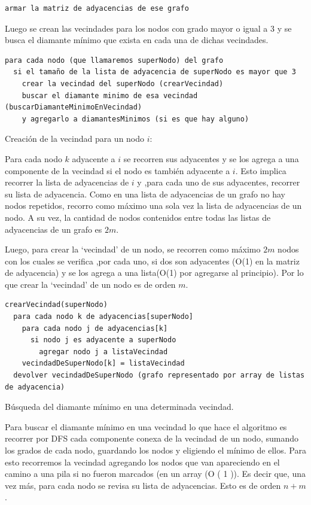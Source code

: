 \documentclass[a4paper,11pt] {article}
\begin{document}
\begin{verbatim}
armar la matriz de adyacencias de ese grafo
\end{verbatim}

Luego se crean las vecindades para los nodos con grado mayor o igual a 3 y se busca el diamante mínimo que exista en cada una de dichas vecindades.

\begin{verbatim}
para cada nodo (que llamaremos superNodo) del grafo
  si el tamaño de la lista de adyacencia de superNodo es mayor que 3
    crear la vecindad del superNodo (crearVecindad)
    buscar el diamante minimo de esa vecindad (buscarDiamanteMinimoEnVecindad)
    y agregarlo a diamantesMinimos (si es que hay alguno)
\end{verbatim}

Creación de la vecindad para un nodo $i$:

Para cada nodo $k$ adyacente a $i$ se recorren sus adyacentes y se los agrega a una componente de la vecindad si el nodo es también adyacente a $i$.
Esto implica recorrer la lista de adyacencias de $i$ y ,para cada uno de sus  adyacentes, recorrer su lista de adyacencia. Como en una lista de adyacencias de un grafo no hay nodos repetidos, recorro como máximo una sola vez la lista de adyacencias de un nodo. A su vez, la cantidad de nodos contenidos entre todas las listas de adyacencias de un grafo es $2m$.

Luego, para crear la ‘vecindad’ de un nodo, se recorren como máximo $2m$ nodos con los cuales se verifica ,por cada uno, si dos son adyacentes (O(1) en la matriz de adyacencia) y se los agrega a una lista(O(1) por agregarse al principio). Por lo que crear la ‘vecindad’ de un nodo es de orden $m$.

\begin{verbatim}
crearVecindad(superNodo)
  para cada nodo k de adyacencias[superNodo]
    para cada nodo j de adyacencias[k]
      si nodo j es adyacente a superNodo
        agregar nodo j a listaVecindad
    vecindadDeSuperNodo[k] = listaVecindad
  devolver vecindadDeSuperNodo (grafo representado por array de listas de adyacencia)
\end{verbatim}

Búsqueda del diamante mínimo en una determinada vecindad.

Para buscar el diamante mínimo en una vecindad lo que hace el algoritmo es recorrer por DFS cada componente conexa de la vecindad de un nodo,  sumando los grados de cada nodo, guardando los nodos y eligiendo el mínimo de ellos.
Para esto recorremos la vecindad agregando los nodos que van apareciendo en el camino a una pila si no fueron marcados (en un array (O ( 1 )). Es decir que, una vez más, para cada nodo se revisa su lista de adyacencias. Esto es de orden $n + m$.
\end{document}
